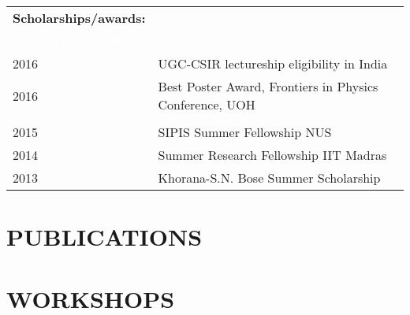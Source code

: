 \newpage
\begin{tabular}{l l}
	\textbf{\large Scholarships/awards:} & \\
	\textcolor{white}{May 2015 - Jun 2015}& \\
	2016 & UGC-CSIR lectureship eligibility in India \\
	2016 & Best Poster Award, Frontiers in Physics Conference, UOH \\
	& \\
	2015 & SIPIS Summer Fellowship NUS \\
	2014 & Summer Research Fellowship IIT Madras\\	
	2013 & Khorana-S.N. Bose Summer Scholarship\\
\end{tabular}

\section*{PUBLICATIONS}


%

\section*{WORKSHOPS} %


%

%
%
%